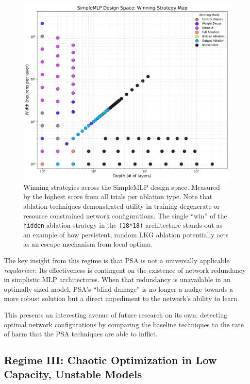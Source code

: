 \documentclass[conference]{IEEEtran}
\begin{document}
\begin{figure}[ht]
\centering
\includegraphics[width=\linewidth]{SimpleMLP_Heatmap_Winning_Strategy.png}
\caption{Winning strategies across the SimpleMLP design space. Measured by the highest score from all trials per ablation type. Note that ablation techniques demonstrated utility in training degenerate or resource constrained network configurations. The single ``win'' of the \texttt{hidden} ablation strategy in the \texttt{(18*18)} architecture stands out as an example of how persistent, random LKG ablation potentially acts as an escape mechanism from local optima.}
\label{fig:heatmap_winning}
\end{figure}

The key insight from this regime is that PSA is not a universally applicable \textit{regularizer}. Its effectiveness is contingent on the existence of network redundancy in simplistic MLP architectures. When that redundancy is unavailable in an optimally sized model, PSA's ``blind damage'' is no longer a nudge towards a more robust solution but a direct impediment to the network's ability to learn.

This presents an interesting avenue of future research on its own: detecting optimal network configurations by comparing the baseline techniques to the rate of harm that the PSA techniques are able to inflict.

\subsection{Regime III: Chaotic Optimization in Low Capacity, Unstable Models}
\end{document}
